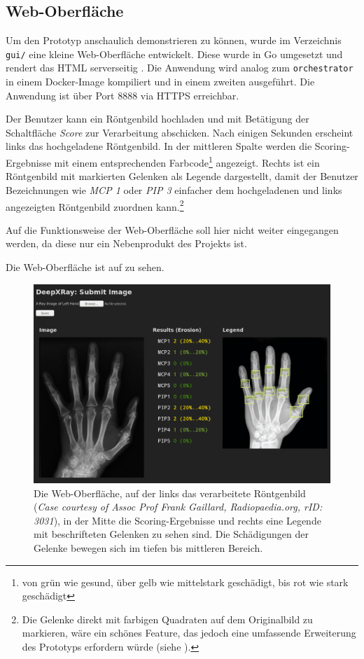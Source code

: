 \subsection{Web-Oberfläche}

Um den Prototyp anschaulich demonstrieren zu können, wurde im Verzeichnis \texttt{gui/} eine kleine Web-Oberfläche entwickelt. Diese wurde in Go umgesetzt und rendert das HTML serverseitig \cite[Kapitel 4.6]{gopl}. Die Anwendung wird analog zum \texttt{orchestrator} in einem Docker-Image kompiliert und in einem zweiten ausgeführt. Die Anwendung ist über Port 8888 via HTTPS erreichbar.

Der Benutzer kann ein Röntgenbild hochladen und mit Betätigung der Schaltfläche \textit{Score} zur Verarbeitung abschicken. Nach einigen Sekunden erscheint links das hochgeladene Röntgenbild. In der mittleren Spalte werden die Scoring-Ergebnisse mit einem entsprechenden Farbcode\footnote{von grün wie gesund, über gelb wie mittelstark geschädigt, bis rot wie stark geschädigt} angezeigt. Rechts ist ein Röntgenbild mit markierten Gelenken als Legende dargestellt, damit der Benutzer Bezeichnungen wie \textit{MCP 1} oder \textit{PIP 3} einfacher dem hochgeladenen und links angezeigten Röntgenbild zuordnen kann.\footnote{Die Gelenke direkt mit farbigen Quadraten auf dem Originalbild zu markieren, wäre ein schönes Feature, das jedoch eine umfassende Erweiterung des Prototyps erfordern würde (siehe ).}

Auf die Funktionsweise der Web-Oberfläche soll hier nicht weiter eingegangen werden, da diese nur ein Nebenprodukt des Projekts ist.

Die Web-Oberfläche ist auf  zu sehen.

\begin{figure}[tbh]
    \centering
    \includegraphics[width=\linewidth]{pics/web-ui-demo.png}
    \caption{Die Web-Oberfläche, auf der links das verarbeitete Röntgenbild (\textit{Case courtesy of Assoc Prof Frank Gaillard, Radiopaedia.org, rID: 3031}), in der Mitte die Scoring-Ergebnisse und rechts eine Legende mit beschrifteten Gelenken zu sehen sind. Die Schädigungen der Gelenke bewegen sich im tiefen bis mittleren Bereich.}
    \label{fig:webgui}
\end{figure}

\clearpage
